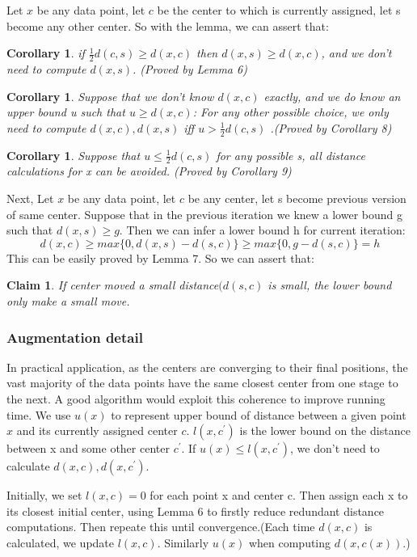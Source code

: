 \documentclass[11pt]{article}
\newtheorem{corollary}[theorem]{Corollary}
\newtheorem{claim}[theorem]{Claim}
\begin{document}
Let $x$ be any data point, let $c$ be the center to which is currently assigned, let s become any other center. So with the lemma, we can assert that:
\begin{corollary}
if $\frac{1}{2}d(c, s) \ge d(x,c)$ then $d(x, s) \ge d(x, c)$, and we don't need to compute $d(x,s)$. (Proved by Lemma 6)
\end{corollary}

\begin{corollary}
Suppose that we don't know $d(x,c)$ exactly, and we do know an upper bound u such that $u \ge d(x,c)$: For any other possible choice, we only need to compute $d(x, c), d(x, s)$ iff $u > \frac{1}{2}d(c, s)$ .(Proved by Corollary 8)
\end{corollary}
\begin{corollary}
Suppose that $u \le \frac{1}{2}d(c, s)$ for any possible s, all distance calculations for x can be avoided. (Proved by Corollary 9)
\end{corollary}

Next, Let $x$ be any data point, let $c$ be any center, let s become previous version of same center. Suppose that in the previous iteration we knew a lower bound g such that $d(x, s) \ge g$. Then we can infer a lower bound h for current iteration:
$$
d(x, c) \ge max\{0, d(x,s)-d(s,c)\} \ge max\{0, g-d(s,c)\} = h
$$
This can be easily proved by Lemma 7. So we can assert that:

\begin{claim}
If center moved a small distance$(d(s,c)$ is small, the lower bound only make a small move.
\end{claim}

\subsubsection{Augmentation detail}
In practical application, as the centers are converging to their final positions, the vast majority of the data points have the same closest center from one stage to the next. A good algorithm would exploit this coherence to improve running time. We use $u(x)$ to represent upper bound of distance between a given point $x$ and its currently assigned center $c$. $l(x,c^{\prime})$ is the lower bound on the distance between x and some other center $c^{\prime}$. If $u(x) \le l(x,c^{\prime}) $, we don't need to calculate $d(x,c), d(x, c^{\prime})$. \par
Initially, we set $l(x,c)=0$ for each point x and center c. Then assign each x to its closest initial center, using Lemma 6 to firstly reduce redundant distance computations. Then repeate this until convergence.(Each time $d(x,c)$ is calculated, we update $l(x,c)$. Similarly $u(x)$ when computing $d(x,c(x))$.)
\end{document}
